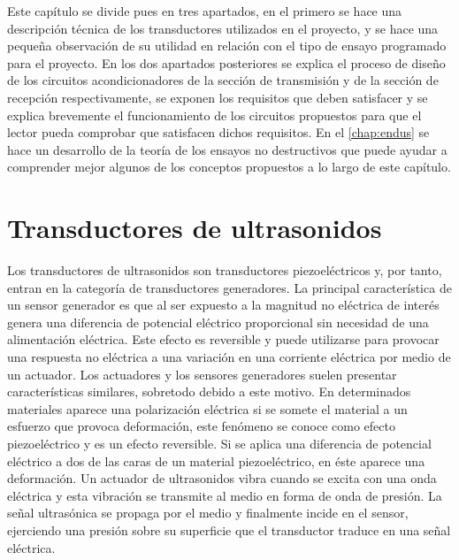 Este capítulo se divide pues en tres apartados, en el primero se hace una
descripción técnica de los transductores utilizados en el proyecto, y se
hace una pequeña observación de su utilidad en relación con el tipo de
ensayo programado para el proyecto. En los dos apartados posteriores se
explica el proceso de diseño de los circuitos acondicionadores de la
sección de transmisión y de la sección de recepción respectivamente, se
exponen los requisitos que deben satisfacer y se explica brevemente el
funcionamiento de los circuitos propuestos para que el lector pueda
comprobar que satisfacen dichos requisitos. En el \cref{chap:endus} se hace
un desarrollo de la teoría de los ensayos no destructivos que puede ayudar
a comprender mejor algunos de los conceptos propuestos a lo largo de este
capítulo.


\section{Transductores de ultrasonidos}\label{sec:transducers}

Los transductores de ultrasonidos son transductores piezoeléctricos y, por
tanto, entran en la categoría de transductores generadores. La principal
característica de un sensor generador es que al ser expuesto a la magnitud
no eléctrica de interés genera una diferencia de potencial eléctrico
proporcional sin necesidad de una alimentación eléctrica. Este efecto es
reversible y puede utilizarse para provocar una respuesta no eléctrica a
una variación en una corriente eléctrica por medio de un actuador. Los
actuadores y los sensores generadores suelen presentar características
similares, sobretodo debido a este motivo.  En determinados materiales
aparece una polarización eléctrica si se somete el material a un esfuerzo
que provoca deformación, este fenómeno se conoce como efecto piezoeléctrico
y es un efecto reversible. Si se aplica una diferencia de potencial
eléctrico a dos de las caras de un material piezoeléctrico, en éste aparece
una deformación.  Un actuador de ultrasonidos vibra cuando se excita con
una onda eléctrica y esta vibración se transmite al medio en forma de onda
de presión. La señal ultrasónica se propaga por el medio y finalmente
incide en el sensor, ejerciendo una presión sobre su superficie que el
transductor traduce en una señal eléctrica.

